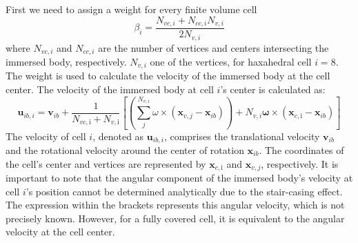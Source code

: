 First we need to assign a weight for every finite volume cell 
\begin{equation}
\beta_{i}=\frac{N_{v c, i}+N_{c c, i} N_{v, i}}{2 N_{v, i}}
\end{equation}
where $N_{v c, i}$ and $N_{c c, i} $ are the number of vertices and centers intersecting the immersed body, respectively. $N_{v, i}$ one of the vertices, for haxahedral cell $i = 8$. The weight is used to calculate the velocity of the immersed body at the cell center. The velocity of the immersed body at cell $i$'s center is calculated as:
\begin{equation} \label{IB_forces}
    \boldsymbol{u}_{i b, i} = \boldsymbol{v}_{i b}+\frac{1}{N_{v c, \mathrm{i}}+N_{v, \mathrm{i}}}\left[\left(\sum_{j}^{N_{v, i}} \omega \times\left(\boldsymbol{x}_{v, j}-\boldsymbol{x}_{i b}\right)\right)+N_{v, i} \boldsymbol{\omega} \times\left(\boldsymbol{x}_{c, \mathrm{i}}-\boldsymbol{x}_{i b}\right)\right]
\end{equation}
The velocity of cell $i$, denoted as $\boldsymbol{u}_{ib, i}$, comprises the translational velocity $\boldsymbol{v}_{ib}$ and the rotational velocity around the center of rotation $\boldsymbol{x}_{ib}$. The coordinates of the cell's center and vertices are represented by $\boldsymbol{x}_{c, \mathrm{i}}$ and $\boldsymbol{x}_{v, j}$, respectively. It is important to note that the angular component of the immersed body's velocity at cell $i$'s position cannot be determined analytically due to the stair-casing effect. The expression within the brackets represents this angular velocity, which is not precisely known.
However, for a fully covered cell, it is equivalent to the angular velocity at the cell center.
